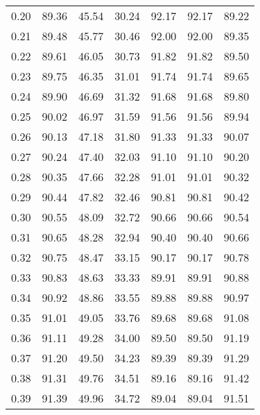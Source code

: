 \begin{tabular}{|c|c|c|c|c|c|c|}
      0.20 &     89.36 &     45.54 &      30.24 &   92.17 &      92.17 &         89.22 \\
      0.21 &     89.48 &     45.77 &      30.46 &   92.00 &      92.00 &         89.35 \\
      0.22 &     89.61 &     46.05 &      30.73 &   91.82 &      91.82 &         89.50 \\
      0.23 &     89.75 &     46.35 &      31.01 &   91.74 &      91.74 &         89.65 \\
      0.24 &     89.90 &     46.69 &      31.32 &   91.68 &      91.68 &         89.80 \\
      0.25 &     90.02 &     46.97 &      31.59 &   91.56 &      91.56 &         89.94 \\
      0.26 &     90.13 &     47.18 &      31.80 &   91.33 &      91.33 &         90.07 \\
      0.27 &     90.24 &     47.40 &      32.03 &   91.10 &      91.10 &         90.20 \\
      0.28 &     90.35 &     47.66 &      32.28 &   91.01 &      91.01 &         90.32 \\
      0.29 &     90.44 &     47.82 &      32.46 &   90.81 &      90.81 &         90.42 \\
      0.30 &     90.55 &     48.09 &      32.72 &   90.66 &      90.66 &         90.54 \\
      0.31 &     90.65 &     48.28 &      32.94 &   90.40 &      90.40 &         90.66 \\
      0.32 &     90.75 &     48.47 &      33.15 &   90.17 &      90.17 &         90.78 \\
      0.33 &     90.83 &     48.63 &      33.33 &   89.91 &      89.91 &         90.88 \\
      0.34 &     90.92 &     48.86 &      33.55 &   89.88 &      89.88 &         90.97 \\
      0.35 &     91.01 &     49.05 &      33.76 &   89.68 &      89.68 &         91.08 \\
      0.36 &     91.11 &     49.28 &      34.00 &   89.50 &      89.50 &         91.19 \\
      0.37 &     91.20 &     49.50 &      34.23 &   89.39 &      89.39 &         91.29 \\
      0.38 &     91.31 &     49.76 &      34.51 &   89.16 &      89.16 &         91.42 \\
      0.39 &     91.39 &     49.96 &      34.72 &   89.04 &      89.04 &         91.51 \\

\end{tabular}
